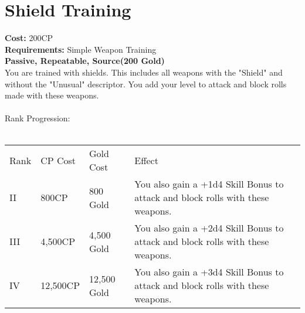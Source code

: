 \section{Shield Training}\label{perk:shieldTraining}
\textbf{Cost:} 200CP\\
\textbf{Requirements:} Simple Weapon Training\\
\textbf{Passive, Repeatable, Source(200 Gold)}\\
You are trained with shields.
This includes all weapons with the "Shield" and without the "Unusual" descriptor.
You add your level to attack and block rolls made with these weapons.\\
\\
Rank Progression:\\
\\
\begin{longtable}{l | l | l | p{9cm}}
	Rank & CP Cost & Gold Cost & Effect\\
	II & 800CP & 800 Gold & You also gain a +1d4 Skill Bonus to attack and block rolls with these weapons.\\
	III & 4,500CP & 4,500 Gold & You also gain a +2d4 Skill Bonus to attack and block rolls with these weapons.\\
	IV & 12,500CP & 12,500 Gold & You also gain a +3d4 Skill Bonus to attack and block rolls with these weapons.\\
\end{longtable}